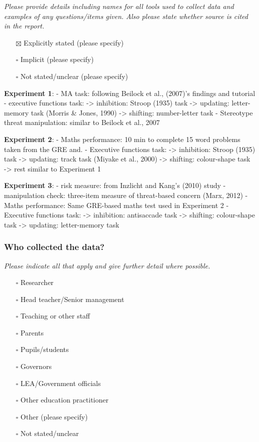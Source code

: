 \documentclass[
  doc, a4paper]{apa7}
\providecommand{\tightlist}{%
  \setlength{\itemsep}{0pt}\setlength{\parskip}{0pt}}
\begin{document}
\emph{Please provide details including names for all tools used to collect data and examples of any questions/items given. Also please state whether source is cited in the report.}

\begin{itemize}
\tightlist
\item[$\boxtimes$]
  Explicitly stated (please specify)
\item[$\square$]
  Implicit (please specify)
\item[$\square$]
  Not stated/unclear (please specify)
\end{itemize}

\textbf{Experiment 1}:
- MA task: following Beilock et al., (2007)'s findings and tutorial
- executive functions task:
-\textgreater{} inhibition: Stroop (1935) task
-\textgreater{} updating: letter-memory task (Morris \& Jones, 1990)
-\textgreater{} shifting: number-letter task
- Stereotype threat manipulation: similar to Beilock et al., 2007

\textbf{Experiment 2}:
- Maths performance: 10 min to complete 15 word problems taken from the GRE and.
- Executive functions task:
-\textgreater{} inhibition: Stroop (1935) task
-\textgreater{} updating: track task (Miyake et al., 2000)
-\textgreater{} shifting: colour-shape task\\
-\textgreater{} rest similar to Experiment 1

\textbf{Experiment 3}:
- risk measure: from Inzlicht and Kang's (2010) study
- manipulation check: three-item measure of threat-based concern (Marx, 2012)
- Maths performance: Same GRE-based maths test used in Experiment 2
- Executive functions task:
-\textgreater{} inhibition: antisaccade task
-\textgreater{} shifting: colour-shape task
-\textgreater{} updating: letter-memory task

\subsubsection{Who collected the data?}\label{who-collected-the-data}

\emph{Please indicate all that apply and give further detail where possible.}

\begin{itemize}
\tightlist
\item[$\square$]
  Researcher
\item[$\square$]
  Head teacher/Senior management
\item[$\square$]
  Teaching or other staff
\item[$\square$]
  Parents
\item[$\square$]
  Pupils/students
\item[$\square$]
  Governors
\item[$\square$]
  LEA/Government officials
\item[$\square$]
  Other education practitioner
\item[$\square$]
  Other (please specify)
\item[$\square$]
  Not stated/unclear
\end{itemize}
\end{document}
